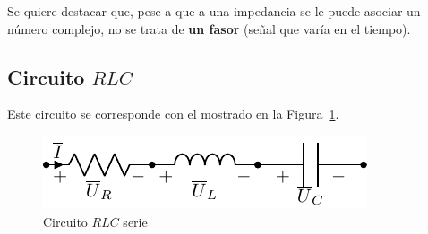 \documentclass[11pt]{book} %
\begin{document}
	\begin{remark}
		Se quiere destacar que, pese a que a una impedancia se le puede asociar un número complejo, no se trata de \textbf{un fasor} (señal que varía en el tiempo).
	\end{remark}
	
	\subsection{Circuito $RLC$}\label{sec.RLC}
	
	Este circuito se corresponde con el mostrado en la Figura~\ref{fig.RLC}. 
	\begin{figure}[h]
		\centering
		\includegraphics[width=0.4\linewidth]{../figs/RLC.pdf}
		\caption{Circuito $RLC$ serie}
		\label{fig.RLC}
	\end{figure}
	
\end{document}
